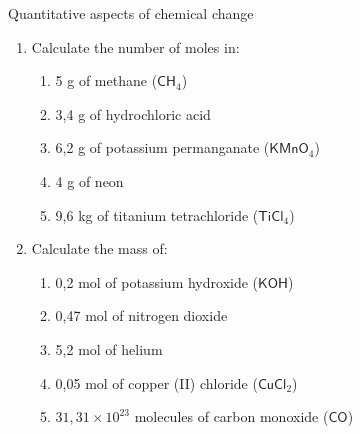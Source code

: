 \begin{eocexercises}{Quantitative aspects of chemical change}
\begin{enumerate}[noitemsep, label=\textbf{\arabic*}. ]
\begin{enumerate}[noitemsep, label=\textbf{\alph*}. ]
\begin{enumerate}[noitemsep, label=\textbf{\alph*}. ]
\end{enumerate}
                \label{m38712*uid137}\item In the compound potassium sulphate ($\mathsf{K}{}_{2}\mathsf{SO}{}_{4}$), oxygen makes up x\% of the mass of the compound. x = ...
\label{m38712*id286432}\begin{enumerate}[noitemsep, label=\textbf{\alph*}. ] 
            \label{m38712*uid138}\item 36.8
\label{m38712*uid139}\item 9,2
\label{m38712*uid140}\item 4
\label{m38712*uid141}\item 18,3
\end{enumerate}
                \label{m38712*uid142}\item The concentration of a $150\phantom{\rule{2pt}{0ex}}{\mathsf{cm}}^{3}$ solution, containing 5 g of $\mathsf{NaCl}$ is...
\label{m38712*id286512}\begin{enumerate}[noitemsep, label=\textbf{\alph*}. ] 
            \label{m38712*uid143}\item $0,09\phantom{\rule{2pt}{0ex}}\mathsf{M}$
\label{m38712*uid144}\item $5,7\phantom{\rule{2pt}{0ex}}\ensuremath{\times}10{}^{-4}\phantom{\rule{2pt}{0ex}}\mathsf{M}$
\label{m38712*uid145}\item $0,57\phantom{\rule{2pt}{0ex}}\mathsf{M}$
\label{m38712*uid146}\item $0,03\phantom{\rule{2pt}{0ex}}\mathsf{M}$
\end{enumerate}
                \end{enumerate}
        \item Calculate the number of moles in:
\label{m38712*id6342}\begin{enumerate}[noitemsep, label=\textbf{\alph*}. ] 
            \item 5 g of methane (${\mathsf{CH}}_{4}$)\item 3,4 g of hydrochloric acid\item 6,2 g of potassium permanganate (${\mathsf{KMnO}}_{4}$)\item 4 g of neon\item 9,6 kg of titanium tetrachloride (${\mathsf{TiCl}}_{4}$)\end{enumerate}
        \item Calculate the mass of:\label{m38712*id7342}\begin{enumerate}[noitemsep, label=\textbf{\alph*}. ] 
            \item 0,2 mol of potassium hydroxide ($\mathsf{KOH}$)\item 0,47 mol of nitrogen dioxide\item 5,2 mol of helium\item 0,05 mol of copper (II) chloride (${\mathsf{CuCl}}_{2}$)\item $31,31\ensuremath{\times}{10}^{23}$ molecules of carbon monoxide ($\mathsf{CO}$)\end{enumerate}

\end{enumerate}
\end{eocexercises}

